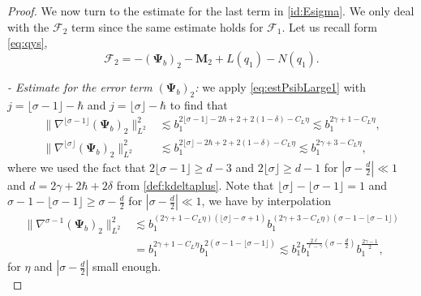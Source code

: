 \documentclass[11pt]{aims}
\theoremstyle{definition}
\numberwithin{equation}{section}
\begin{document}
\begin{proof}
We now turn to the estimate for the last term in \eqref{id:Esigma}. We only deal with the ${\mathcal{F}}_2$ term since the same estimate holds for ${\mathcal{F}}_1$. Let us recall form \eqref{eq:qys}, 
$${\mathcal{F}}_2 = - (\mathbf{\Psi}_b)_2 - \mathbf{M}_2 + L(q_1) - N(q_1).$$

\noindent \textit{- Estimate for the error term $(\mathbf{\Psi}_b)_2$:} we apply \eqref{eq:estPsibLarge1} with $j = \lfloor\sigma -1 \rfloor- \hbar$ and $j = \lfloor\sigma\rfloor - \hbar$ to find that 
\begin{align*}
 \|\nabla^{\lfloor\sigma -1 \rfloor}(\mathbf{\Psi}_b)_2\|_{L^2}^2 &\lesssim b_1^{2\lfloor\sigma -1 \rfloor - 2\hbar + 2 + 2(1 - \delta) - C_L\eta} \lesssim b_1^{2\gamma + 1 - C_L\eta},\\
\|\nabla^{\lfloor\sigma\rfloor}(\mathbf{\Psi}_b)_2\|_{L^2}^2 &\lesssim b_1^{2\lfloor\sigma\rfloor - 2\hbar + 2 + 2(1 - \delta) - C_L\eta} \lesssim b_1^{2\gamma + 3 - C_L\eta},
\end{align*}
where we used the fact that $2\lfloor\sigma -1 \rfloor\geq d- 3$ and $2\lfloor\sigma\rfloor \geq d - 1$ for $\left|\sigma - \frac{d}{2}\right| \ll 1$ and $d = 2\gamma +2\hbar + 2\delta$ from \eqref{def:kdeltaplus}.
Note that $\lfloor\sigma\rfloor - \lfloor\sigma -1 \rfloor = 1$ and $\sigma - 1 - \lfloor\sigma -1 \rfloor \geq \sigma - \frac{d}{2}$ for $\left|\sigma - \frac{d}{2}\right| \ll 1$, we have by interpolation
\begin{align}
\|\nabla^{\sigma - 1}(\mathbf{\Psi}_b)_2\|_{L^2}^2 &\lesssim b_1^{(2\gamma + 1 - C_L \eta) (\lfloor\sigma \rfloor - \sigma +1)}b_1^{(2\gamma + 3 - C_L\eta)(\sigma - 1 - \lfloor\sigma -1 \rfloor)}\nonumber\\
& = b_1^{2\gamma + 1 - C_L\eta}b_1^{2(\sigma - 1 - \lfloor\sigma -1 \rfloor)} \lesssim b_1^2 b_1^{\frac{2\ell}{\ell - \gamma}\left(\sigma - \frac d2\right)} b_1^{\frac{2\gamma - 1}{2}},\label{est:errEs}
\end{align}
for $\eta$ and $\left|\sigma - \frac{d}{2}\right|$ small enough.\\


\end{proof}
\end{document}
